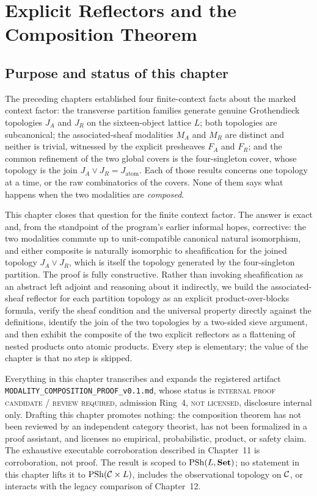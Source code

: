 \chapter{Explicit Reflectors and the Composition Theorem}
\label{ch10:chapter}

\section{Purpose and status of this chapter}
\label{ch10:sec:purpose}

The preceding chapters established four finite-context facts about the marked
context factor: the transverse partition families generate genuine Grothendieck
topologies $J_A$ and $J_R$ on the sixteen-object lattice $L$; both topologies
are subcanonical; the associated-sheaf modalities $M_A$ and $M_R$ are distinct
and neither is trivial, witnessed by the explicit presheaves $F_A$ and $F_R$;
and the common refinement of the two global covers is the four-singleton cover,
whose topology is the join $J_A \vee J_R = J_{\mathrm{atom}}$.
Each of those results concerns one topology at a time, or the raw combinatorics
of the covers. None of them says what happens when the two modalities are
\emph{composed}.

This chapter closes that question for the finite context factor. The answer is
exact and, from the standpoint of the program's earlier informal hopes,
corrective: the two modalities commute up to unit-compatible canonical natural
isomorphism, and either composite is naturally isomorphic to sheafification for
the joined topology $J_A \vee J_R$, which is itself the topology generated by
the four-singleton partition. The proof is fully constructive. Rather than
invoking sheafification as an abstract left adjoint and reasoning about it
indirectly, we build the associated-sheaf reflector for each partition topology
as an explicit product-over-blocks formula, verify the sheaf condition and the
universal property directly against the definitions, identify the join of the
two topologies by a two-sided sieve argument, and then exhibit the composite of
the two explicit reflectors as a flattening of nested products onto atomic
products. Every step is elementary; the value of the chapter is that no step is
skipped.

\begin{boundary}
\label{ch10:bnd:status}
Everything in this chapter transcribes and expands the registered artifact
\texttt{MODALITY\_COMPOSITION\_PROOF\_v0.1.md}, whose status is
\textsc{internal proof candidate / review required}, admission Ring~4,
\textsc{not licensed}, disclosure internal only. Drafting this chapter promotes
nothing: the composition theorem has not been reviewed by an independent
category theorist, has not been formalized in a proof assistant, and licenses
no empirical, probabilistic, product, or safety claim. The exhaustive
executable corroboration described in Chapter~11 is corroboration, not proof.
The result is scoped to $\mathrm{PSh}(L, \mathbf{Set})$; no statement in this chapter lifts it
to $\mathrm{PSh}(\mathcal{C} \times L)$, includes the observational topology on $\mathcal{C}$, or
interacts with the legacy comparison of Chapter~12.
\end{boundary}


